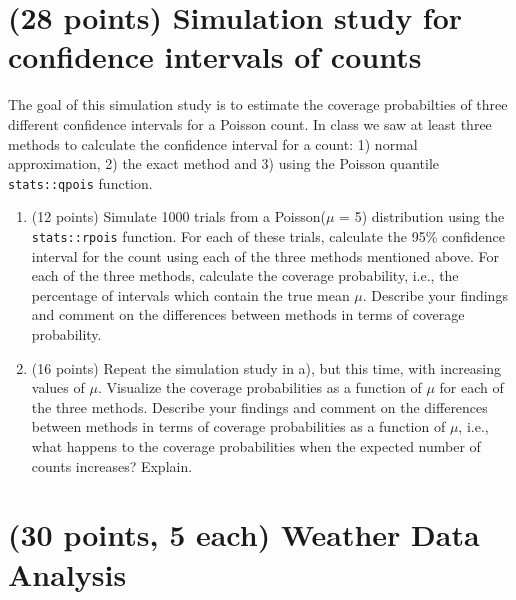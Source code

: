 \documentclass[letterpaper,12pt,twoside,]{pinp}
\begin{document}
\hypertarget{points-simulation-study-for-confidence-intervals-of-counts}{%
\section{(28 points) Simulation study for confidence intervals of
counts}\label{points-simulation-study-for-confidence-intervals-of-counts}}

The goal of this simulation study is to estimate the coverage
probabilties of three different confidence intervals for a Poisson
count. In class we saw at least three methods to calculate the
confidence interval for a count: 1) normal approximation, 2) the exact
method and 3) using the Poisson quantile \texttt{stats::qpois} function.

\begin{enumerate}
\def\labelenumi{\alph{enumi})}
\item
  (12 points) Simulate 1000 trials from a Poisson(\(\mu\) = 5)
  distribution using the \texttt{stats::rpois} function. For each of
  these trials, calculate the 95\% confidence interval for the count
  using each of the three methods mentioned above. For each of the three
  methods, calculate the coverage probability, i.e., the percentage of
  intervals which contain the true mean \(\mu\). Describe your findings
  and comment on the differences between methods in terms of coverage
  probability.
\item
  (16 points) Repeat the simulation study in a), but this time, with
  increasing values of \(\mu\). Visualize the coverage probabilities as
  a function of \(\mu\) for each of the three methods. Describe your
  findings and comment on the differences between methods in terms of
  coverage probabilities as a function of \(\mu\), i.e., what happens to
  the coverage probabilities when the expected number of counts
  increases? Explain.
\end{enumerate}

\hypertarget{points-5-each-weather-data-analysis}{%
\section{(30 points, 5 each) Weather Data
Analysis}\label{points-5-each-weather-data-analysis}}
\end{document}
